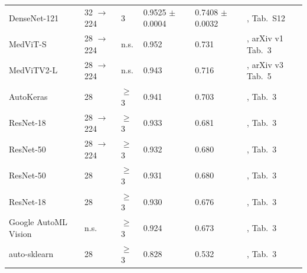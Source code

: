 \begin{table}[t]
\begin{tabular}{@{}llllll@{}}
DenseNet-121 & 32 $\rightarrow$ 224 & 3 & 0.9525 $\pm$ 0.0004 & 0.7408 $\pm$ 0.0032 & \cite{doerrich2025medmnistplus}, Tab.~S12 \\
MedViT-S & 28 $\rightarrow$ 224 & n.s. & 0.952 & 0.731 & \cite{manzari2023medvit}, arXiv v1 Tab.~3 \\
MedViTV2-L & 28 $\rightarrow$ 224 & n.s. & 0.943 & 0.716 & \cite{manzari2026medvitv2}, arXiv v3 Tab.~5 \\
AutoKeras & 28 & $\geq$3 & 0.941 & 0.703 & \cite{yang2023medmnistv2}, Tab.~3 \\
ResNet-18 & 28 $\rightarrow$ 224 & $\geq$3 & 0.933 & 0.681 & \cite{yang2023medmnistv2}, Tab.~3 \\
ResNet-50 & 28 $\rightarrow$ 224 & $\geq$3 & 0.932 & 0.680 & \cite{yang2023medmnistv2}, Tab.~3 \\
ResNet-50 & 28 & $\geq$3 & 0.931 & 0.680 & \cite{yang2023medmnistv2}, Tab.~3 \\
ResNet-18 & 28 & $\geq$3 & 0.930 & 0.676 & \cite{yang2023medmnistv2}, Tab.~3 \\
Google AutoML Vision & n.s. & $\geq$3 & 0.924 & 0.673 & \cite{yang2023medmnistv2}, Tab.~3 \\
auto-sklearn & 28 & $\geq$3 & 0.828 & 0.532 & \cite{yang2023medmnistv2}, Tab.~3 \\
\bottomrule
\end{tabular}
\end{table}
